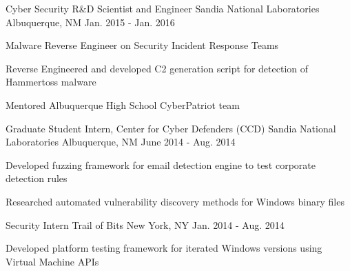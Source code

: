 \begin{cventries}

\cventry
{Cyber Security R\&D Scientist and Engineer} %
{Sandia National Laboratories} %
{Albuquerque, NM} %
{Jan. 2015 - Jan. 2016} %
{ %
\begin{cvitems}
\item {Malware Reverse Engineer on Security Incident Response Teams}
\item {Reverse Engineered and developed C2 generation script for detection of Hammertoss malware}
\item {Mentored Albuquerque High School CyberPatriot team}
\end{cvitems}
}


\cventry
{Graduate Student Intern, Center for Cyber Defenders (CCD)} %
{Sandia National Laboratories} %
{Albuquerque, NM} %
{June 2014 - Aug. 2014} %
{ %
\begin{cvitems}
\item {Developed fuzzing framework for email detection engine to test corporate detection rules}
\item {Researched automated vulnerability discovery methods for Windows binary files}
\end{cvitems}
}


\cventry
{Security Intern} %
{Trail of Bits} %
{New York, NY} %
{Jan. 2014 - Aug. 2014} %
{ %
\begin{cvitems}
\item {Developed platform testing framework for iterated Windows versions using Virtual Machine APIs}
\end{cvitems}
}


\begin{displaySection}


\end{displaySection}
\end{cventries}
